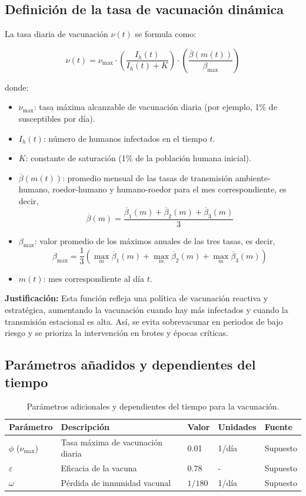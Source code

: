 \documentclass[12pt,a4paper]{article}
\begin{document}
\subsection{Definición de la tasa de vacunación dinámica}

La tasa diaria de vacunación $\nu(t)$ se formula como:

\[
\nu(t) = \nu_{\max} \cdot \left( \frac{I_h(t)}{I_h(t) + K} \right) \cdot \left( \frac{\overline{\beta}(m(t))}{\beta_{\max}} \right)
\]

donde:
\begin{itemize}
    \item $\nu_{\max}$: tasa máxima alcanzable de vacunación diaria (por ejemplo, 1\% de susceptibles por día).
    \item $I_h(t)$: número de humanos infectados en el tiempo $t$.
    \item $K$: constante de saturación (1\% de la población humana inicial).
    \item $\overline{\beta}(m(t))$: promedio mensual de las tasas de transmisión ambiente-humano, roedor-humano y humano-roedor para el mes correspondiente, es decir,
    \[
    \overline{\beta}(m) = \frac{\overline{\beta}_1(m) + \overline{\beta}_2(m) + \overline{\beta}_3(m)}{3}
    \]
    \item $\beta_{\max}$: valor promedio de los máximos anuales de las tres tasas, es decir,
    \[
    \beta_{\max} = \frac{1}{3} \left( \max_m \overline{\beta}_1(m) + \max_m \overline{\beta}_2(m) + \max_m \overline{\beta}_3(m) \right)
    \]

    \item $m(t)$: mes correspondiente al día $t$.
\end{itemize}

\textbf{Justificación:} Esta función refleja una política de vacunación reactiva y estratégica, aumentando la vacunación cuando hay más infectados y cuando la transmisión estacional es alta. Así, se evita sobrevacunar en periodos de bajo riesgo y se prioriza la intervención en brotes y épocas críticas.

\subsection{Parámetros añadidos y dependientes del tiempo}

\begin{table}[H]
\centering
\begin{tabular}{@{}lllll@{}}
\toprule
\textbf{Parámetro} & \textbf{Descripción} & \textbf{Valor} & \textbf{Unidades} & \textbf{Fuente} \\
\midrule
$\phi$ ($\nu_{\max}$) & Tasa máxima de vacunación diaria & 0.01 & 1/día & Supuesto \\
$\varepsilon$ & Eficacia de la vacuna & 0.78 & - & Supuesto \\
$\omega$ & Pérdida de inmunidad vacunal & $1/180$ & 1/día & Supuesto \\
\bottomrule
\end{tabular}
\caption{Parámetros adicionales y dependientes del tiempo para la vacunación.}
\end{table}
\end{document}
